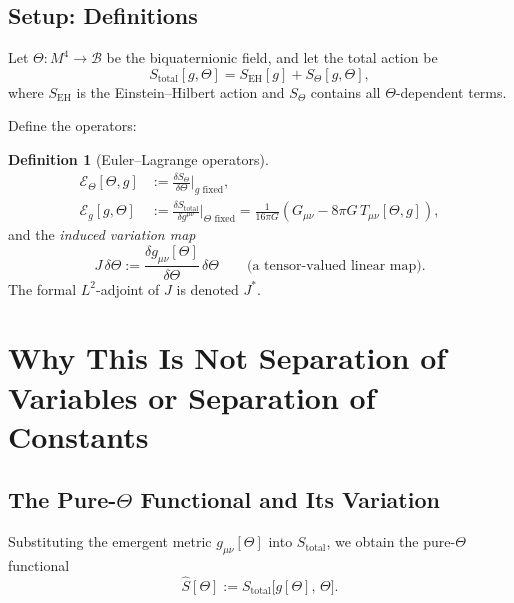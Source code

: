 \documentclass[12pt]{article}
\theoremstyle{definition}
\newtheorem{definition}[theorem]{Definition}
\theoremstyle{remark}
\begin{document}
\subsection{Setup: Definitions}
\label{subsec:setup}

Let $\Theta: M^4 \to \mathcal{B}$ be the biquaternionic field, and let the
total action be
\begin{equation}
  S_{\text{total}}[g, \Theta]
  = S_{\text{EH}}[g] + S_\Theta[g, \Theta],
\end{equation}
where $S_{\text{EH}}$ is the Einstein--Hilbert action and $S_\Theta$ contains
all $\Theta$-dependent terms.

Define the operators:

\begin{definition}[Euler--Lagrange operators]
\label{def:el_operators}
\begin{align}
  \mathcal{E}_\Theta[\Theta, g]
  &:= \frac{\delta S_\Theta}{\delta\Theta}\bigg|_{g \text{ fixed}},
  \label{eq:E_Theta}\\[6pt]
  \mathcal{E}_g[g, \Theta]
  &:= \frac{\delta S_{\text{total}}}{\delta g^{\mu\nu}}\bigg|_{\Theta \text{ fixed}}
   = \frac{1}{16\pi G}\left(G_{\mu\nu} - 8\pi G\, T_{\mu\nu}[\Theta,g]\right),
  \label{eq:E_g}
\end{align}
and the \emph{induced variation map}
\begin{equation}
  J\,\delta\Theta := \frac{\delta g_{\mu\nu}[\Theta]}{\delta\Theta}\,\delta\Theta
  \qquad\text{(a tensor-valued linear map)}.
  \label{eq:J_map}
\end{equation}
The formal $L^2$-adjoint of $J$ is denoted $J^*$.
\end{definition}

\section{Why This Is Not Separation of Variables or Separation of Constants}
\label{sec:not_separation}

\subsection{The Pure-$\Theta$ Functional and Its Variation}
\label{subsec:pure_theta}

Substituting the emergent metric $g_{\mu\nu}[\Theta]$ into
$S_{\text{total}}$, we obtain the pure-$\Theta$ functional
\begin{equation}
  \hat{S}[\Theta]
  := S_{\text{total}}\bigl[g[\Theta],\, \Theta\bigr].
  \label{eq:S_hat}
\end{equation}
\end{document}
